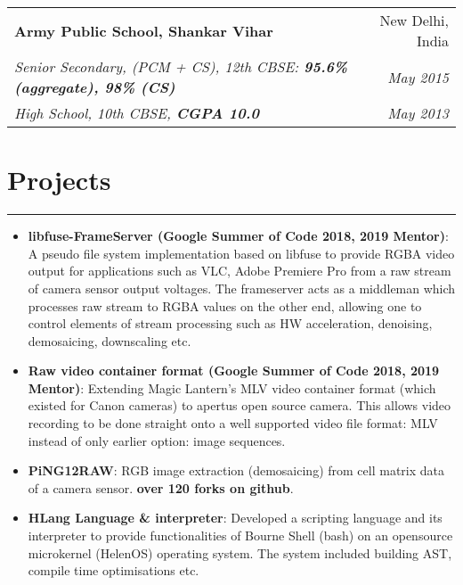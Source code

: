 \documentclass[a4paper,6pt]{article}
\begin{document}
\vspace{5px}
\hspace{5px}
\begin{tabularx}{\textwidth}{X r}
	\textbf{Army Public School, Shankar Vihar} & New Delhi, India \\
	\textit{\small Senior Secondary, (PCM + CS), 12th CBSE:  \textcolor{mygray}{\textbf{95.6\% (aggregate), 98\% (CS)}}} & \textit{May 2015} \\
	\textit{\small High School, 10th CBSE, \textcolor{mygray}{\textbf{CGPA 10.0}}} & \textit{May 2013}
\end{tabularx}




\section*{Projects}
\vspace{-8px}
\hrule
\vspace{4px}
\hspace{5px}
\begin{itemize}
    \item \textbf{libfuse-FrameServer (Google Summer of Code 2018, 2019 Mentor)}:  \small A pseudo file system implementation based on libfuse to provide RGBA video output for applications such as VLC, Adobe Premiere Pro from a raw stream of camera sensor output voltages. The frameserver acts as a middleman which processes raw stream to RGBA values on the other end, allowing one to control elements of stream processing such as HW acceleration, denoising, demosaicing, downscaling etc.\normalsize
\vspace{2px}
    \item \textbf{Raw video container format (Google Summer of Code 2018, 2019 Mentor)}: \small Extending Magic Lantern's MLV video container format (which existed for Canon cameras) to apertus open source camera. This allows video recording to be done straight onto a well supported video file format: MLV instead of only earlier option: image sequences.
 \vspace{2px}
\normalsize
	\item \textbf{PiNG12RAW}: \small RGB image extraction (demosaicing) from cell matrix data of a camera sensor. \textcolor{mygray}{\textbf{over 120 forks on github}}. 
\normalsize
\vspace{2px}
    \item \textbf{HLang Language \& interpreter}: \small Developed a scripting language and its interpreter to provide functionalities of Bourne Shell (bash) on an opensource microkernel (HelenOS) operating system. The system included building AST, compile time optimisations etc. 

\normalsize
\end{itemize}
\end{document}
